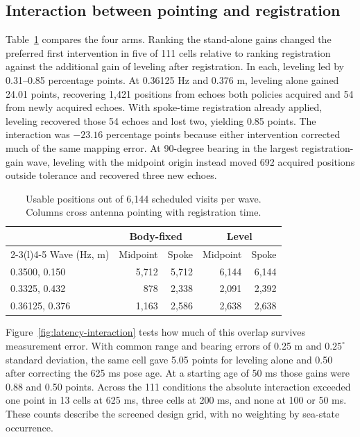 \subsection{Interaction between pointing and registration}

Table~\ref{tab:four-arms} compares the four arms. Ranking the stand-alone gains changed the preferred first intervention in five of 111 cells relative to ranking registration against the additional gain of leveling after registration. In each, leveling led by 0.31--0.85 percentage points. At 0.36125 Hz and 0.376 m, leveling alone gained 24.01 points, recovering 1,421 positions from echoes both policies acquired and 54 from newly acquired echoes. With spoke-time registration already applied, leveling recovered those 54 echoes and lost two, yielding 0.85 points. The interaction was $-23.16$ percentage points because either intervention corrected much of the same mapping error. At 90-degree bearing in the largest registration-gain wave, leveling with the midpoint origin instead moved 692 acquired positions outside tolerance and recovered three new echoes.

\begin{table}[tb]
\caption{Usable positions out of 6,144 scheduled visits per wave. Columns cross antenna pointing with registration time.}\label{tab:four-arms}
\centering\small
\begin{tabular}{@{}lrrrr@{}}
\toprule
 & \multicolumn{2}{c}{Body-fixed} & \multicolumn{2}{c}{Level}\\
\cmidrule(lr){2-3}\cmidrule(l){4-5}
Wave (Hz, m) & Midpoint & Spoke & Midpoint & Spoke \\
\midrule
0.3500, 0.150 & 5,712 & 5,712 & 6,144 & 6,144 \\
0.3325, 0.432 & 878 & 2,338 & 2,091 & 2,392 \\
0.36125, 0.376 & 1,163 & 2,586 & 2,638 & 2,638 \\
\bottomrule
\end{tabular}
\end{table}

Figure~\ref{fig:latency-interaction} tests how much of this overlap survives measurement error. With common range and bearing errors of 0.25 m and $0.25^\circ$ standard deviation, the same cell gave 5.05 points for leveling alone and 0.50 after correcting the 625 ms pose age. At a starting age of 50 ms those gains were 0.88 and 0.50 points. Across the 111 conditions the absolute interaction exceeded one point in 13 cells at 625 ms, three cells at 200 ms, and none at 100 or 50 ms. These counts describe the screened design grid, with no weighting by sea-state occurrence.

